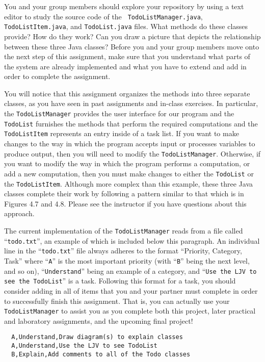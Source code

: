 \documentclass[11pt]{article}
\begin{document}
You and your group members should explore your repository by using a text editor to study the source code of the {\tt
TodoListManager.java}, {\tt TodoListItem.java}, and {\tt TodoList.java} files. What methods do these classes provide?
How do they work? Can you draw a picture that depicts the relationship between these three Java classes? Before you and
your group members move onto the next step of this assignment, make sure that you understand what parts of the system
are already implemented and what you have to extend and add in order to complete the assignment.

You will notice that this assignment organizes the methods into three separate classes, as you have seen in past
assignments and in-class exercises. In particular, the {\tt TodoListManager} provides the user interface for our program
and the {\tt TodoList} furnishes the methods that perform the required computations and the {\tt TodoListItem}
represents an entry inside of a task list. If you want to make changes to the way in which the program accepts input or
processes variables to produce output, then you will need to modify the {\tt TodoListManager}. Otherwise, if you want to
modify the way in which the program performs a computation, or add a new computation, then you must make changes to
either the {\tt TodoList} or the {\tt TodoListItem}. Although more complex than this example, these three Java classes
complete their work by following a pattern similar to that which is in Figures 4.7 and 4.8. Please see the instructor if
you have questions about this approach.

The current implementation of the {\tt TodoListManager} reads from a file called ``{\tt todo.txt}'', an example of which
is included below this paragraph. An individual line in the ``{\tt todo.txt}'' file always adheres to the format
``Priority, Category, Task'' where ``{\tt A}'' is the most important priority (with ``{\tt B}'' being the next level,
and so on), ``{\tt Understand}'' being an example of a category, and ``{\tt Use the LJV to see the TodoList}'' is a
task.  Following this format for a task, you should consider adding in all of items that you and your partner must
complete in order to successfully finish this assignment. That is, you can actually use your {\tt TodoListManager} to
assist you as you complete both this project, later practical and laboratory assignments, and the upcoming final
project!

\vspace{-0.05in}
\begin{verbatim}
  A,Understand,Draw diagram(s) to explain classes
  A,Understand,Use the LJV to see TodoList
  B,Explain,Add comments to all of the Todo classes
\end{verbatim}
\vspace{-0.05in}
\end{document}
